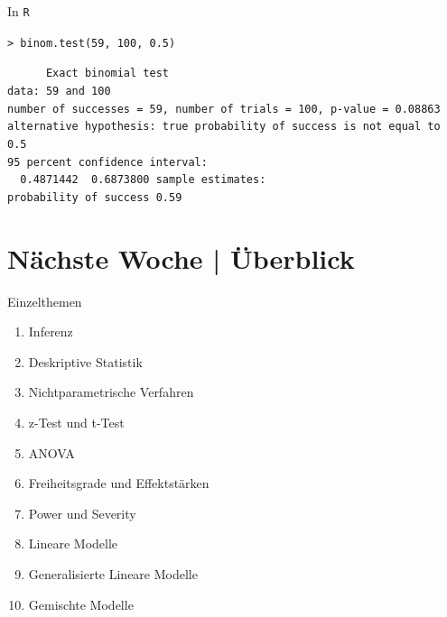 \begin{frame}
  {In \texttt{R}}
  \begin{center}
    \texttt{> binom.test(59, 100, 0.5)}
  \end{center}
\tt\footnotesize
\ \ \ \ \ Exact binomial test\\[4ex]

data:  59 and 100\\
number of successes = 59, number of trials = 100, p-value = 0.08863\\
alternative hypothesis: true probability of success is not equal to 0.5\\
95 percent confidence interval:\\
\ \ 0.4871442\ \ 0.6873800
sample estimates:\\
probability of success 0.59 \\
\end{frame}


\ifdefined\TITLE
  \section{Nächste Woche | Überblick}

  \begin{frame}
    {Einzelthemen}
    \begin{enumerate}
      \item Inferenz
      \item Deskriptive Statistik
      \item Nichtparametrische Verfahren
      \item \alert{z-Test und t-Test}
      \item ANOVA
      \item Freiheitsgrade und Effektstärken
      \item Power und Severity
      \item Lineare Modelle
      \item Generalisierte Lineare Modelle
      \item Gemischte Modelle
    \end{enumerate}
  \end{frame}
\fi

